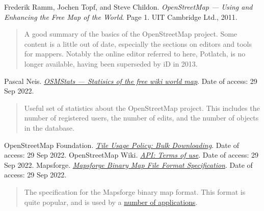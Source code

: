 \documentclass[]{final_report}
\begin{document}
\newpage
\begin{thebibliography}{99}
 Frederik Ramm, Jochen Topf, and Steve Childon. \emph{OpenStreetMap --- Using and Enhancing the Free Map of the World}. Page 1. UIT Cambridge Ltd., 2011.
\begin{quote}
    A good summary of the basics of the OpenStreetMap project. Some content is a little out of date, especially the sections on editors and tools for mappers. Notably the online editor referred to here, Potlatch, is no longer available, having been superseded by iD in 2013.
\end{quote}
 Pascal Neis. \emph{\href{https://osmstats.neis-one.org/?item=members}{OSMStats --- Statisics of the free wiki world map}}. Date of access: 29 Sep 2022.
\begin{quote}
    Useful set of statistics about the OpenStreetMap project. This includes the number of registered users, the number of edits, and the number of objects in the database.
\end{quote}
 OpenStreetMap Foundation. \emph{\href{https://operations.osmfoundation.org/policies/tiles/\#bulk-downloading}{Tile Usage Policy: Bulk Downloading}}. Date of access: 29 Sep 2022.
 OpenStreetMap Wiki. \emph{\href{https://wiki.openstreetmap.org/wiki/API\#Terms_of_use}{API: Terms of use}}. Date of access: 29 Sep 2022.
 Mapsforge. \emph{\href{https://github.com/mapsforge/mapsforge/blob/master/docs/Specification-Binary-Map-File.md}{Mapsforge Binary Map File Format Specification}}. Date of access: 29 Sep 2022.
\begin{quote}
    The specification for the Mapsforge binary map format. This format is quite popular, and is used by a \href{https://github.com/mapsforge/mapsforge/blob/master/docs/Mapsforge-Applications.md}{number of applications}.
\end{quote}

\end{thebibliography}
\label{endpage}
\end{document}
